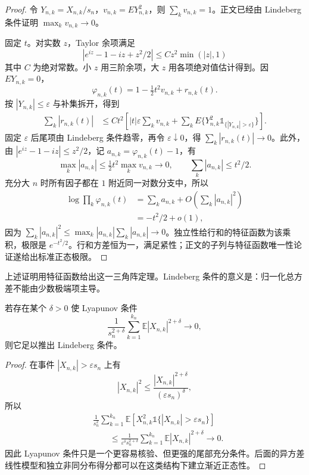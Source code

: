 \begin{proof}
令 $Y_{n,k}=X_{n,k}/s_n$，$v_{n,k}=EY_{n,k}^2$，则 $\sum_kv_{n,k}=1$。正文已经由 Lindeberg 条件证明 $\max_kv_{n,k}\to0$。

固定 $t$。对实数 $z$，Taylor 余项满足
\[
 |e^{iz}-1-iz+z^2/2|\le C z^2\min(|z|,1)
\]
其中 $C$ 为绝对常数。小 $z$ 用三阶余项，大 $z$ 用各项绝对值估计得到。因 $EY_{n,k}=0$，
\[
 \varphi_{n,k}(t)=1-\tfrac12t^2v_{n,k}+r_{n,k}(t).
\]
按 $|Y_{n,k}|\le\varepsilon$ 与补集拆开，得到
\begin{align*}
 \sum_k|r_{n,k}(t)|
 &\le C t^2\left[|t|\varepsilon\sum_kv_{n,k}
 +\sum_kE\{Y_{n,k}^2\mathds{1}_{\{|Y_{n,k}|>\varepsilon\}}\}\right].
\end{align*}
固定 $\varepsilon$ 后尾项由 Lindeberg 条件趋零，再令 $\varepsilon\downarrow0$，得 $\sum_k|r_{n,k}(t)|\to0$。此外，由 $|e^{iz}-1-iz|\le z^2/2$，记 $a_{n,k}=\varphi_{n,k}(t)-1$，有
\[
 \max_k|a_{n,k}|\le\tfrac12t^2\max_kv_{n,k}\to0,
 \qquad \sum_k|a_{n,k}|\le t^2/2.
\]
充分大 $n$ 时所有因子都在 $1$ 附近同一对数分支中，所以
\begin{align*}
 \log\prod_k\varphi_{n,k}(t)
 &=\sum_ka_{n,k}+O\!\left(\sum_k|a_{n,k}|^2\right)\\
 &=-t^2/2+o(1),
\end{align*}
因为 $\sum_k|a_{n,k}|^2\le\max_k|a_{n,k}|\sum_k|a_{n,k}|\to0$。独立性给行和的特征函数为该乘积，极限是 $e^{-t^2/2}$。行和方差恒为一，满足紧性；正文的子列与特征函数唯一性论证遂给出标准正态极限。
\end{proof}

上述证明用特征函数给出这一三角阵定理。Lindeberg 条件的意义是：归一化总方差不能由少数极端项主导。\begin{corollary}
若存在某个 $\delta>0$ 使 Lyapunov 条件
\[
 \frac{1}{s_n^{2+\delta}}
 \sum_{k=1}^{k_n}\mathbb E|X_{n,k}|^{2+\delta}\to0,
\]
则它足以推出 Lindeberg 条件。\end{corollary}
\begin{proof}
在事件 $|X_{n,k}|>\varepsilon s_n$ 上有
\[
 |X_{n,k}|^2
 \le
 \frac{|X_{n,k}|^{2+\delta}}
 {(\varepsilon s_n)^\delta},
\]
所以
\begin{align*}
 &\frac1{s_n^2}
 \sum_{k=1}^{k_n}
 \mathbb E\!\left[
 X_{n,k}^2\mathds{1}\{|X_{n,k}|>\varepsilon s_n\}
 \right]\\
 &\qquad\le
 \frac1{\varepsilon^\delta s_n^{2+\delta}}
 \sum_{k=1}^{k_n}\mathbb E|X_{n,k}|^{2+\delta}
 \longrightarrow0.
\end{align*}
因此 Lyapunov 条件只是一个更容易核验、但更强的尾部充分条件。后面的异方差线性模型和独立非同分布得分都可以在这类结构下建立渐近正态性。

\end{proof}

